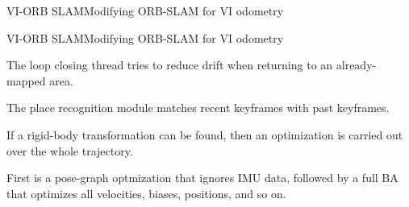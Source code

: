 \documentclass[aspectratio=169]{beamer}
\newcommand{\myfig}[3]{\centerline{\texttt{[image: \#2]}}
    \centerline{\scriptsize \begin{minipage}{#1} \centering #3 \end{minipage}}}
\begin{document}
\begin{frame}{VI-ORB SLAM}{Modifying ORB-SLAM for VI odometry}


\end{frame}


\begin{frame}{VI-ORB SLAM}{Modifying ORB-SLAM for VI odometry}

The \alert{loop closing thread}
tries to reduce drift when returning to an already-mapped area.

\medskip

The place recognition module matches recent keyframes with
past keyframes.

\medskip

If a rigid-body transformation can be found, then an
optimization is carried out over the whole trajectory.

\medskip

First is a pose-graph optmization that ignores IMU data, followed by a
full BA that optimizes all velocities, biases, positions, and so on.

\end{frame}
\end{document}
